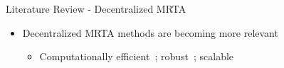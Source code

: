 \begin{frame}{Literature Review - Decentralized MRTA}
    \begin{itemize}
        \item Decentralized MRTA methods are becoming more relevant
        \begin{itemize}
            \item Computationally efficient~\cite{choi2009consensus}; robust~\cite{chopra2017distributed}; scalable~\cite{shorinwa2023distributed}
        \end{itemize}
    \end{itemize}


\end{frame}
